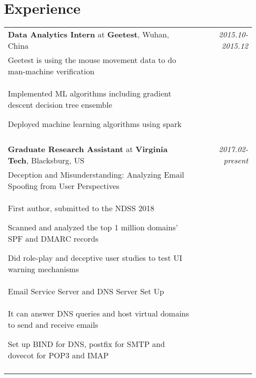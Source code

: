 \documentclass[a4paper,10pt]{article}
\begin{document}
\section{Experience}
\begin{tabular}{p{13.5cm}p{0.5cm}r}

\textbf{Data Analytics Intern} at \textbf{Geetest}, Wuhan, China && \emph{2015.10-2015.12} \\
\hspace{1em} Geetest is using the mouse movement data to do man-machine verification&& \vspace{-0.5em}\\
\begin{compactitem}
  \item Implemented ML algorithms including gradient descent decision tree ensemble
  \item Deployed machine learning algorithms using spark
\end{compactitem}&&\vspace{-2.2em} \\
\multicolumn{3}{c}{} \\

\textbf{Graduate Research Assistant} at \textbf{Virginia Tech}, Blacksburg, US && \emph{2017.02-present} \\
\hspace{1em} Deception and Misunderstanding: Analyzing Email Spoofing from User Perspectives && \vspace{-0.5em}\\
\begin{compactitem}
  \item First author, submitted to the NDSS 2018
  \item Scanned and analyzed the top 1 million domains' SPF and DMARC records
  \item Did role-play and deceptive user studies to test UI warning mechanisms
\end{compactitem}&& \vspace{-1em}\\

\hspace{1em} Email Service Server and DNS Server Set Up && \vspace{-0.5em}\\
\begin{compactitem}
  \item It can answer DNS queries and host virtual domains to send and receive emails
  \item Set up BIND for DNS, postfix for SMTP and dovecot for POP3 and IMAP
\end{compactitem}&&\vspace{-2.2em} \\
\multicolumn{3}{c}{} \\

\end{tabular}
\end{document}
